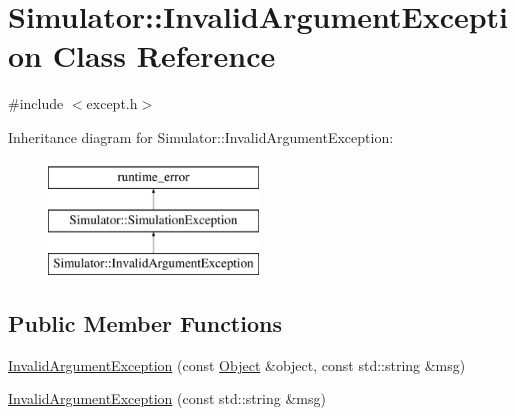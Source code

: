 \hypertarget{class_simulator_1_1_invalid_argument_exception}{\section{Simulator\+:\+:Invalid\+Argument\+Exception Class Reference}
\label{class_simulator_1_1_invalid_argument_exception}
}


{\ttfamily \#include $<$except.\+h$>$}

Inheritance diagram for Simulator\+:\+:Invalid\+Argument\+Exception\+:\begin{figure}[H]
\begin{center}
\leavevmode
\includegraphics[height=3.000000cm]{class_simulator_1_1_invalid_argument_exception}
\end{center}
\end{figure}
\subsection*{Public Member Functions}
\begin{DoxyCompactItemize}
\item 
\hyperlink{class_simulator_1_1_invalid_argument_exception_aa24c202e5ab535cb6f8788ef2bdc716f}{Invalid\+Argument\+Exception} (const \hyperlink{class_simulator_1_1_object}{Object} \&object, const std\+::string \&msg)
\item 
\hyperlink{class_simulator_1_1_invalid_argument_exception_a710a166def39272fcfeec5f947378a05}{Invalid\+Argument\+Exception} (const std\+::string \&msg)
\end{DoxyCompactItemize}


